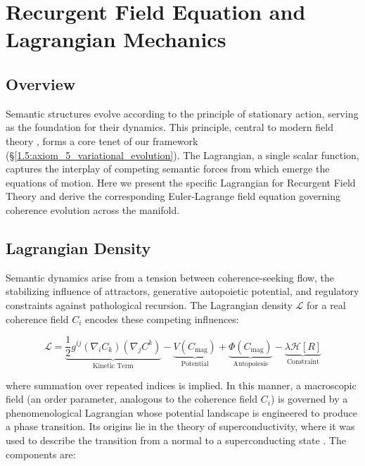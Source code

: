 \chapter{Recurgent Field Equation and Lagrangian Mechanics}
\label{6:recurgent_field_equation_and_lagrangian_mechanics}


\section{Overview}
\label{6.1:overview}

Semantic structures evolve according to the principle of stationary action, serving as the foundation for their dynamics. This principle, central to modern field theory \autocite{GoldsteinPooleSafko2002, Arnold1989}, forms a core tenet of our framework (\S\ref{1.5:axiom_5_variational_evolution}). The Lagrangian, a single scalar function, captures the interplay of competing semantic forces from which emerge the equations of motion. Here we present the specific Lagrangian for Recurgent Field Theory and derive the corresponding Euler-Lagrange field equation governing coherence evolution across the manifold.


\section{Lagrangian Density}
\label{6.2:lagrangian_density}

Semantic dynamics arise from a tension between coherence-seeking flow, the stabilizing influence of attractors, generative autopoietic potential, and regulatory constraints against pathological recursion. The Lagrangian density \(\mathcal{L}\) for a real coherence field \(C_i\) encodes these competing influences:

\begin{equation}
\mathcal{L} = \underbrace{\frac{1}{2} g^{ij} (\nabla_i C_k)(\nabla_j C^k)}_{\text{Kinetic Term}} - \underbrace{V(C_{\text{mag}})}_{\text{Potential}} + \underbrace{\Phi(C_{\text{mag}})}_{\text{Autopoiesis}} - \underbrace{\lambda \mathcal{H}[R]}_{\text{Constraint}}
\end{equation}

where summation over repeated indices is implied. In this manner, a macroscopic field (an order parameter, analogous to the coherence field \(C_i\)) is governed by a phenomenological Lagrangian whose potential landscape is engineered to produce a phase transition. Its origins lie in the theory of superconductivity, where it was used to describe the transition from a normal to a superconducting state \autocite{GinzburgLandau1950}. The components are:

